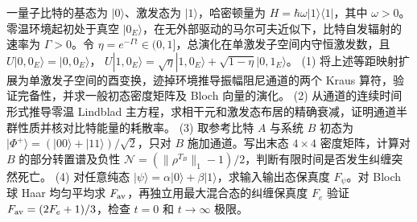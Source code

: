 一量子比特的基态为 \(|0\rangle\)、激发态为 \(|1\rangle\)，哈密顿量为 \(H=\hbar\omega|1\rangle\langle1|\)，其中 \(\omega>0\)。零温环境起初处于真空 \(|0_E\rangle\)，在无外部驱动的马尔可夫近似下，比特自发辐射的速率为 \(\Gamma>0\)。令 \(\eta=e^{-\Gamma t}\in(0,1]\)，总演化在单激发子空间内守恒激发数，且
\(U|0,0_E\rangle=|0,0_E\rangle\)，
\(U|1,0_E\rangle=\sqrt{\eta}|1,0_E\rangle+\sqrt{1-\eta}|0,1_E\rangle\)。
(1) 将上述等距映射扩展为单激发子空间的酉变换，迹掉环境推导振幅阻尼通道的两个 Kraus 算符，验证完备性，并求一般初态密度矩阵及 Bloch 向量的演化。
(2) 从通道的连续时间形式推导零温 Lindblad 主方程，求相干元和激发态布居的精确衰减，证明通道半群性质并核对比特能量的耗散率。
(3) 取参考比特 \(A\) 与系统 \(B\) 初态为 \(|\Phi^+\rangle=(|00\rangle+|11\rangle)/\sqrt2\)，只对 \(B\) 施加通道。写出末态 \(4\times4\) 密度矩阵，计算对 \(B\) 的部分转置谱及负性 \(\mathcal N=(\|\rho^{T_B}\|_1-1)/2\)，判断有限时间是否发生纠缠突然死亡。
(4) 对任意纯态 \(|\psi\rangle=\alpha|0\rangle+\beta|1\rangle\)，求输入输出态保真度 \(F_\psi\)。对 Bloch 球 Haar 均匀平均求 \(F_{\rm av}\)，再独立用最大混合态的纠缠保真度 \(F_e\) 验证 \(F_{\rm av}=(2F_e+1)/3\)，检查 \(t=0\) 和 \(t\to\infty\) 极限。
